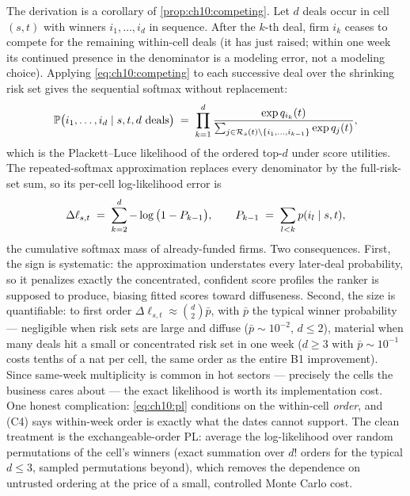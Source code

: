 The derivation is a corollary of \cref{prop:ch10:competing}. Let $d$
deals occur in cell $(s,t)$ with winners $i_1, \dots, i_d$ in sequence.
After the $k$-th deal, firm $i_k$ ceases to compete for the remaining
within-cell deals (it has just raised; within one week its continued
presence in the denominator is a modeling error, not a modeling choice).
Applying \cref{eq:ch10:competing} to each successive deal over the
shrinking risk set gives the sequential softmax without replacement:
\begin{equation}\label{eq:ch10:pl}
\mathbb{P}\big(i_1, \dots, i_d \mid s, t, d \text{ deals}\big)
 \;=\;
 \prod_{k=1}^{d}
 \frac{\exp q_{i_k}(t)}
      {\sum_{j \in \mathcal{R}_s(t) \setminus \{i_1, \dots, i_{k-1}\}}
       \exp q_j(t)} ,
\end{equation}
which is the Plackett--Luce likelihood of the ordered top-$d$ under score
utilities. The repeated-softmax approximation replaces every denominator
by the full-risk-set sum, so its per-cell log-likelihood error is
\begin{equation}\label{eq:ch10:plbias}
\Delta \ell_{s,t}
 \;=\;
 \sum_{k=2}^{d} -\log\big(1 - P_{k-1}\big),
 \qquad
 P_{k-1} \;=\; \sum_{l < k} p(i_l \mid s, t),
\end{equation}
the cumulative softmax mass of already-funded firms. Two consequences.
First, the sign is systematic: the approximation understates every
later-deal probability, so it penalizes exactly the concentrated,
confident score profiles the ranker is supposed to produce, biasing
fitted scores toward diffuseness. Second, the size is quantifiable: to
first order $\Delta \ell_{s,t} \approx \binom{d}{2} \bar p$, with $\bar
p$ the typical winner probability --- negligible when risk sets are large
and diffuse ($\bar p \sim 10^{-2}$, $d \le 2$), material when many deals
hit a small or concentrated risk set in one week ($d \ge 3$ with $\bar p
\sim 10^{-1}$ costs tenths of a nat per cell, the same order as the
entire B1 improvement). Since same-week multiplicity is common in hot
sectors --- precisely the cells the business cares about --- the exact
likelihood is worth its implementation cost. One honest complication:
\cref{eq:ch10:pl} conditions on the within-cell \emph{order}, and (C4)
says within-week order is exactly what the dates cannot support. The
clean treatment is the exchangeable-order PL: average the log-likelihood
over random permutations of the cell's winners (exact summation over
$d!$ orders for the typical $d \le 3$, sampled permutations beyond),
which removes the dependence on untrusted ordering at the price of a
small, controlled Monte Carlo cost.

